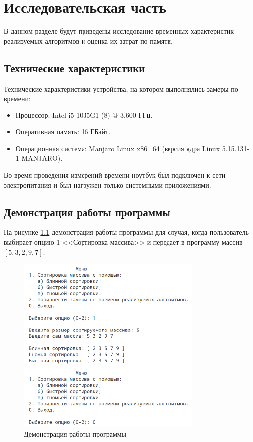 \chapter{Исследовательская часть}

В данном разделе будут приведены исследование временных характеристик реализуемых алгоритмов и оценка их затрат по памяти.

\section{Технические характеристики}

Технические характеристики устройства, на котором выполнялись замеры по времени:

\begin{itemize}
    \item Процессор: Intel i5-1035G1 (8) @ 3.600 ГГц.
    \item Оперативная память: 16 ГБайт.
    \item Операционная система: Manjaro Linux x86\_64 (версия ядра Linux 5.15.131-1-MANJARO).
\end{itemize}

Во время проведения измерений времени ноутбук был подключен к сети электропитания и был нагружен только системными приложениями.

\section{Демонстрация работы программы}

На рисунке \ref{fig:prog-demo} демонстрация работы программы для случая, когда пользователь выбирает опцию 1 <<Сортировка массива>> и передает в программу массив $[5, 3, 2, 9, 7]$.

\begin{figure}[H]
    \centering
    \includegraphics[width=0.8\textwidth]{images/prog_demo.png}
    \caption{Демонстрация работы программы}
    \label{fig:prog-demo}
\end{figure}

